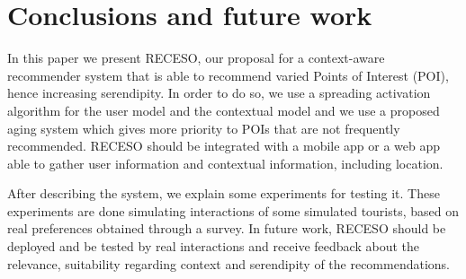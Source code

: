 \section{Conclusions and future work} \label{section:conclu}

In this paper we present RECESO, our proposal for a context-aware recommender system that is able to recommend varied Points of Interest (POI), hence increasing serendipity. In order to do so, we use a spreading activation algorithm for the user model and the contextual model and we use a proposed aging system which gives more priority to POIs that are not frequently recommended. RECESO should be integrated with a mobile app or a web app able to gather user information and contextual information, including location.

After describing the system, we explain some experiments for testing it. These experiments are done simulating interactions of some simulated tourists, based on real preferences obtained through a survey. In future work, RECESO should be deployed and be tested by real interactions and receive feedback about the relevance, suitability regarding context and serendipity of the recommendations.